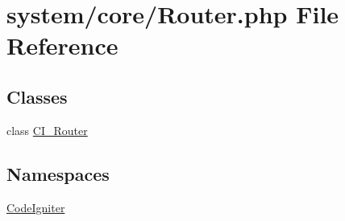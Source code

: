 \hypertarget{_router_8php}{}\section{system/core/\+Router.php File Reference}
\label{_router_8php}
\subsection*{Classes}
\begin{DoxyCompactItemize}
\item 
class \mbox{\hyperlink{class_c_i___router}{C\+I\+\_\+\+Router}}
\end{DoxyCompactItemize}
\subsection*{Namespaces}
\begin{DoxyCompactItemize}
\item 
 \mbox{\hyperlink{namespace_code_igniter}{Code\+Igniter}}
\end{DoxyCompactItemize}
